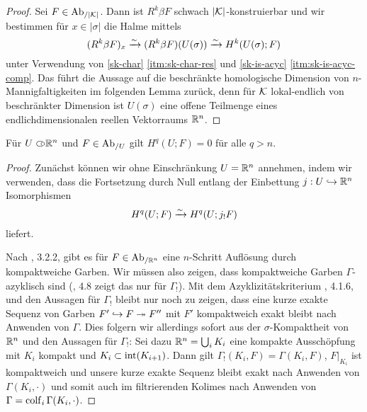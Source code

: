 
\begin{proof}
  Sei $F \in \operatorname{Ab}_{/|\mathcal{K}|}$. Dann ist $R^k \beta F$ schwach
  $|\mathcal{K}|$-konstruierbar und wir bestimmen für $x \in |\sigma|$ die
  Halme mittels
  \[ (R^k \beta F)_x \xrightarrow{\sim} (R^k \beta F)(U(\sigma)) \xrightarrow{\sim} H^k(U(\sigma); F) \]
  unter Verwendung von \ref{sk-char} \ref{itm:sk-char-res} und
  \ref{sk-is-acyc} \ref{itm:sk-is-acyc-comp}. Das führt die Aussage
  auf die beschränkte homologische Dimension von
  $n$-Mannigfaltigkeiten im folgenden Lemma zurück, denn für $\mathcal{K}$
  lokal-endlich von beschränkter Dimension ist $U(\sigma)$ eine offene
  Teilmenge eines endlichdimensionalen reellen Vektorraums $\mathbb{R}^n$.
\end{proof}
\begin{lemma}
  Für $U \subset\kern-0.58em\circ \mathbb{R}^n$ und $F \in \operatorname{Ab}_{/U}$ gilt $H^q(U; F) = 0$ für
  alle $q > n$.
\end{lemma}
\begin{proof}
  Zunächst können wir ohne Einschränkung $U = \mathbb{R}^n$ annehmen, indem
  wir verwenden, dass die Fortsetzung durch Null entlang der
  Einbettung $j: U \hookrightarrow \mathbb{R}^n$ Isomorphismen
  \[ H^q(U; F) \xrightarrow{\sim} H^q(U; j_! F) \]
  liefert.

  Nach \cite{KS}, 3.2.2, gibt es für $F \in \operatorname{Ab}_{/\mathbb{R}^n}$ eine
  $n$-Schritt Auflösung durch kompaktweiche Garben. Wir müssen also
  zeigen, dass kompaktweiche Garben $\Gamma$-azyklisch sind
  (\cite{TG}, 4.8 zeigt das nur für $\Gamma_!$). Mit dem
  Azyklizitätskriterium \cite{TG}, 4.1.6, und den Aussagen für
  $\Gamma_!$ bleibt nur noch zu zeigen, dass eine kurze exakte Sequenz
  von Garben $F' \hookrightarrow F \twoheadrightarrow F''$ mit $F'$ kompaktweich exakt bleibt
  nach Anwenden von $\Gamma$. Dies folgern wir allerdings sofort aus
  der $\sigma$-Kompaktheit von $\mathbb{R}^n$ und den Aussagen für $\Gamma_!$:
  Sei dazu $\mathbb{R}^n = \bigcup_i K_i$ eine kompakte Ausschöpfung mit $K_i$
  kompakt und $K_i \subset \operatorname{int}(K_{i+1})$. Dann gilt $\Gamma_!(K_i,
  F) = \Gamma(K_i, F)$, $F|_{K_i}$ ist kompaktweich und unsere kurze
  exakte Sequenz bleibt exakt nach Anwenden von $\Gamma(K_i, \cdot)$
  und somit auch im filtrierenden Kolimes nach Anwenden von $\Gamma =
  \operatorname{colf}_i \Gamma(K_i, \cdot)$.
\end{proof}


